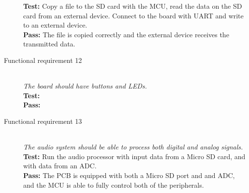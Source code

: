 \begin{description}
        \textbf{Test:} Copy a file to the SD card with the MCU, read the data on the SD card
        from an external device. Connect to the board with UART and write to an external device.\\
        \textbf{Pass:} The file is copied correctly and the external device receives the 
        transmitted data. \\
    \item[Functional requirement 12] \hfill \\
        \textit{The board should have buttons and LEDs.} \\
        \textbf{Test:} \\
        \textbf{Pass:} \\
    \item[Functional requirement 13] \hfill \\
        \textit{The audio system should be able to process both digital and analog signals.} \\
        \textbf{Test:} Run the audio processor with input data from a Micro SD card, and
        with data from an ADC. \\
        \textbf{Pass:} The PCB is equipped with both a Micro SD port and and ADC, and the
        MCU is able to fully control both of the peripherals.\\
\end{description}
